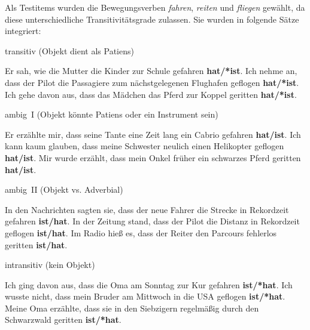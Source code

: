Als Testitems wurden die Bewegungsverben \textit{fahren}, \textit{reiten} und \textit{fliegen} gewählt, da diese unterschiedliche Transitivitätsgrade zulassen. Sie wurden in folgende Sätze integriert:

\begin{exe}
\ex transitiv (Objekt dient als Patiens)
\begin{xlist}
\ex Er sah, wie die Mutter die Kinder zur Schule gefahren \textbf{hat/*ist}.
\ex Ich nehme an, dass der Pilot die Passagiere zum nächstgelegenen Flughafen geflogen \textbf{hat/*ist}.
 \ex Ich gehe davon aus, dass das Mädchen das Pferd zur Koppel geritten \textbf{hat/*ist}.
\end{xlist}
\ex ambig~I (Objekt könnte Patiens oder ein Instrument sein) 
\begin{xlist}
\ex Er erzählte mir, dass seine Tante eine Zeit lang ein Cabrio gefahren \textbf{hat/ist}.
\ex Ich kann kaum glauben, dass meine Schwester neulich einen Helikopter geflogen \textbf{hat/ist}.
\ex Mir wurde erzählt, dass mein Onkel früher ein schwarzes Pferd geritten \textbf{hat/ist}.
\end{xlist}
\ex ambig~II (Objekt vs. Adverbial)
\begin{xlist}
\ex In den Nachrichten sagten sie, dass der neue Fahrer die Strecke in Rekordzeit gefahren \textbf{ist/hat}.
\ex In der Zeitung stand, dass der Pilot die Distanz in Rekordzeit geflogen \textbf{ist/hat}.
\ex Im Radio hieß es, dass der Reiter den Parcours fehlerlos geritten \textbf{ist/hat}.
\end{xlist}
\ex intransitiv (kein Objekt)
\begin{xlist}
\ex Ich ging davon aus, dass die Oma am Sonntag zur Kur gefahren \textbf{ist/*hat}.
\ex Ich wusste nicht, dass mein Bruder am Mittwoch in die USA geflogen \textbf{ist/*hat}.
 \ex Meine Oma erzählte, dass sie in den Siebzigern regelmäßig durch den Schwarzwald geritten \textbf{ist/*hat}.
\end{xlist}
\end{exe}\largerpage


